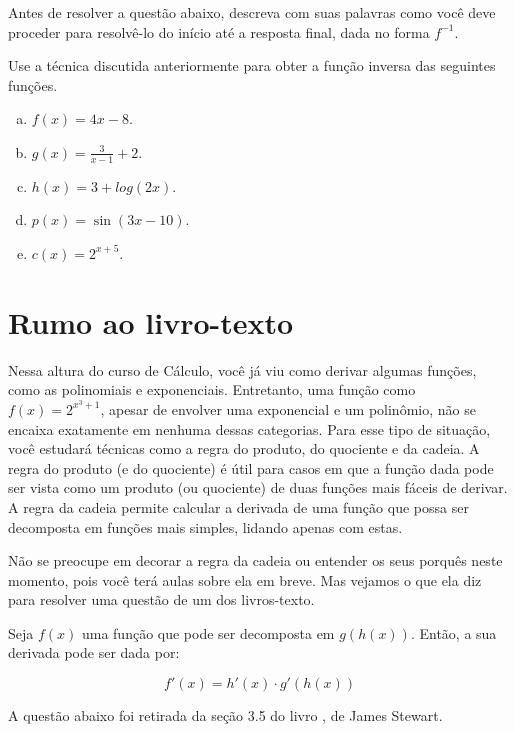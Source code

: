 \documentclass[main_estudante.tex]{subfiles}
\begin{document}
\begin{reflita}
Antes de resolver a questão abaixo, descreva com suas palavras como você deve proceder para resolvê-lo do início até a resposta final, dada no forma $f^{-1}$. 
\end{reflita}

\begin{questao}
Use a técnica discutida anteriormente para obter a função inversa das seguintes funções.
\begin{enumerate}[a)]
\item $f(x)=4x-8$.
\item $g(x)=\frac{3}{x-1}+2$.
\item $h(x)=3+log(2x)$.
\item $p(x)=\sin(3x-10)$.
\item $c(x)=2^{x+5}$.
\end{enumerate}
\end{questao}

\newpage

\section{Rumo ao livro-texto}

Nessa altura do curso de Cálculo, você já viu como derivar algumas funções, como as polinomiais e exponenciais.  Entretanto, uma função como $f(x)=2^{x^3+1}$, apesar de envolver uma exponencial e um polinômio, não se encaixa exatamente em nenhuma dessas categorias. Para esse tipo de situação, você estudará técnicas como a regra do produto, do quociente e da cadeia. A regra do produto (e do quociente) é útil para casos em que a função dada pode ser vista como um produto (ou quociente) de duas funções mais fáceis de derivar. A regra da cadeia permite calcular a derivada de uma função que possa ser decomposta em funções mais simples, lidando apenas com estas.

Não se preocupe em decorar a regra da cadeia ou entender os seus porquês neste momento, pois você terá aulas sobre ela em breve. Mas vejamos o que ela diz para resolver uma questão de um dos livros-texto.

\begin{shaded*}
Seja $f(x)$ uma função que pode ser decomposta em $g(h(x))$. Então, a sua derivada pode ser dada por:

$$f'(x) = h'(x) \cdot g'(h(x)) $$
\end{shaded*}

A questão abaixo foi retirada da seção 3.5 do livro , de James Stewart.
\end{document}
